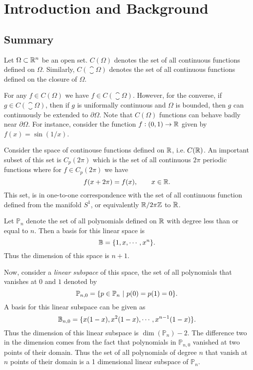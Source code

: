 \chapter{Introduction and Background}


\section{Summary}

\begin{summary}
	Let $ \Omega \subset \mathbb{R}^n $ be an open set. $ C(\Omega) $ denotes the set of all continuous functions defined on $ \Omega $. Similarly, $ C(\closure{\Omega}) $ denotes the set of all continuous functions defined on the closure of $ \Omega $.
	
	For any $ f \in C(\Omega) $ we have $ f \in C(\closure{\Omega}) $. However, for the converse, if $ g \in C(\closure{\Omega}) $, then if $ g $ is uniformally continuous and $ \Omega $ is bounded, then $ g $ can continuously be extended to $ \partial \Omega $. Note that $ C(\Omega) $ functions can behave badly near $ \partial \Omega $. For instance, consider the function $ f:(0,1) \to \mathbb{R} $ given by $ f(x) = \sin(1/x) $.
\end{summary}

\begin{summary}
	Consider the space of continouse functions defined on $ \mathbb{R} $, i.e. $ C(\mathbb{R}) $. An important subset of this set is $ C_p(2\pi) $ which is the set of all continuous $ 2\pi $ periodic functions where for $ f \in C_p(2\pi) $ we have
	\[ f(x+2\pi) = f(x), \qquad x\in \mathbb{R}. \]
	This set, is in one-to-one correspondence with the set of all continuous function defined from the manifold $ S^1 $, or equivalently $ \mathbb{R}/2\pi\mathbb{Z} $ to $ \mathbb{R} $.
\end{summary}

\begin{summary}
	Let $ \mathbb{P}_n $ denote the set of all polynomials defined on $ \mathbb{R} $ with degree less than or equal to $ n $. Then a basis for this linear space is 
	\[ \mathbb{B} = \{1,x,\cdots, x^n\}. \]
	Thus the dimension of this space is $ n+1 $.
	
	Now, consider a \emph{linear subspace} of this space, the set of all polynomials that vanishes at $ 0 $ and $ 1 $ denoted by
	\[ \mathbb{P}_{n,0} = \{p \in \mathbb{P}_n\ |\ p(0)= p(1) = 0\}. \]
	A basis for this linear subspace can be given as
	\[ \mathbb{B}_{n,0} = \{x(1-x),x^2(1-x),\cdots,x^{n-1}(1-x)\}. \]
	Thus the dimension of this linear subspace is $ \dim(\mathbb{P}_n) - 2 $. The difference two in the dimension comes from the fact that polynomials in $ \mathbb{P}_{n,0} $ vanished at two points of their domain. Thus the set of all polynomials of degree $ n $ that vanish at $ n $ points of their domain is a 1 dimensional linear subspace of $ \mathbb{P}_n $.
\end{summary}


